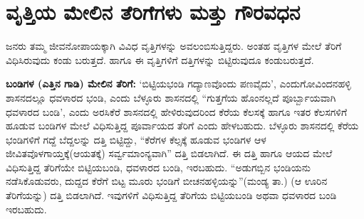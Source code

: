 \section*{ವೃತ್ತಿಯ ಮೇಲಿನ ತೆರಿಗೆಗಳು ಮತ್ತು ಗೌರವಧನ}

ಜನರು ತಮ್ಮ ಜೀವನೋಪಾಯಕ್ಕಾಗಿ ವಿವಿಧ ವೃತ್ತಿಗಳನ್ನು ಅವಲಂಬಿಸುತ್ತಿದ್ದರು. ಅಂತಹ ವೃತ್ತಿಗಳ ಮೇಲೆ ತೆರಿಗೆ ವಿಧಿಸಿರುವುದು ಕಂಡು ಬರುತ್ತದೆ. ಹಾಗೂ ಈ ವೃತ್ತಿಗಳಿಗೆ ದತ್ತಿಗಳನ್ನು ಬಿಟ್ಟಿರುವುದೂ ಕಂಡುಬರುತ್ತದೆ.

\textbf{ಬಂಡಿಗಳ (ಎತ್ತಿನ ಗಾಡಿ) ಮೇಲಿನ ತೆರಿಗೆ:} ‘ಬಿಟ್ಟಿಯಭಂಡಿ ಗದ್ಯಾಣವೊಂದು ಪಣವೈದು’, ಎಂದು\break ಗೋವಿಂದನಹಳ್ಳಿ ಶಾಸನದಲ್ಲೂ ಧವಳಾರದ ಭಂಡಿ, ಎಂದು ಬೆಳ್ಳೂರು ಶಾಸನದಲ್ಲಿ “ಗುತ್ತಗೆಯ ಹೊಂನಲ್ಲದೆ ಪೂರ್ಬ್ಬಾಯ\-ವಾಗಿ ಧವಳಾರದ ಬಂಡಿ’, ಎಂದು ಅರಸಿಕೆರೆ ಶಾಸನದಲ್ಲಿ ಹೇಳಿರುವುದರಿಂದ ಕೆರೆಯ ಕೆಲಸಕ್ಕೆ ಹಾಗೂ ಇತರ ಕೆಲಸಗಳಿಗೆ ಹೂಡುವ ಬಂಡಿಗಳ ಮೇಲೆ ವಿಧಿಸುತ್ತಿದ್ದ ಪೂರ್ವಾಯದ ತೆರಿಗೆ ಎಂದು ಹೇಳಬಹುದು. ಬೆಳ್ಳೂರು ಶಾಸನದಲ್ಲಿ ಕೆರೆಯ ಭಂಡಿಗಳಿಗೆ ಗದ್ದೆ ಬೆದ್ದಲನ್ನು ದತ್ತಿ ಬಿಟ್ಟಿದ್ದು, “ಕೆರೆಗಳ ಕೆಲ್ಸಕ್ಕೆ ಹೂಡುವ ಭಂಡಿಗಳ ಆಳ ಜೀವಿತವೊಳಗಾಯ್ತಕ್ಕೆ(ಆಯತಕ್ಕೆ) ಸರ್ವ್ವಮಾಂನ್ಯವಾಗಿ” ದತ್ತಿ ಬಿಡಲಾಗಿದೆ. ಈ ದತ್ತಿ ಹಾಗೂ ಆಯದ ಮೇಲೆ ವಿಧಿಸುತ್ತಿದ್ದ ತೆರಿಗೆಯೇ ಬಿಟ್ಟಿಯಬಂಡಿ, ಧವಳಾರದ ಬಂಡಿ, ಇರಬಹುದು. “ಅಡುಗಬ್ಬಿನ ಭಂಡಿಯನು ನಡೆಸಿಕೊಡುವರು, ದುದ್ದದ ಕೆರೆಗೆ ಬಿಟ್ಟ ಮೂರು ಭಂಡಿಗೆ ಬೀಚನಹಳ್ಳಿಯನ್ನು”(ಮಂಡ್ಯ ತಾ.) (ಆ ಊರಿನ ತೆರಿಗೆಯನ್ನು) ದತ್ತಿ ಬಿಡಲಾಗಿದೆ. ಇವುಗಳಿಗೆ ವಿಧಿಸುತ್ತಿದ್ದ ತೆರಿಗೆಯ ಬಿಟ್ಟಿಯಬಂಡಿ ಅಥವಾ ಧವಳಾರದ ಬಂಡಿ ಇರಬಹುದು.

